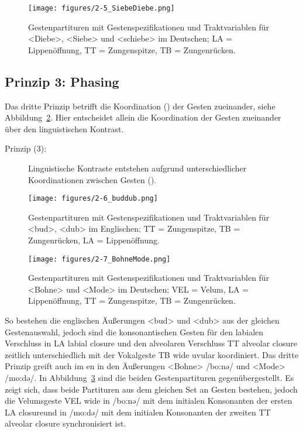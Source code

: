 \begin{figure}[t]
	\texttt{[image: figures/2-5\_SiebeDiebe.png]}
	\caption{Gestenpartituren mit Gestenspezifikationen und Traktvariablen für <Diebe>, <Siebe> und <schiebe> im Deutschen; LA = Lippenöffnung, TT = Zungenspitze, TB = Zungenrücken.}
	\label{figure:0205}
\end{figure}


\subsection{Prinzip 3: Phasing}
\label{subsec:020103}
Das dritte Prinzip betrifft die Koordination () der Gesten zueinander, siehe Abbildung~\ref{figure:0206}. Hier entscheidet allein die Koordination der Gesten zueinander über den linguistischen Kontrast. 

\begin{description}
	\item[Prinzip (3):] Linguistische Kontraste entstehen aufgrund unterschiedlicher Koordinationen zwischen Gesten ().
\end{description}

\begin{figure}
	\texttt{[image: figures/2-6\_buddub.png]}
	\caption{Gestenpartituren mit Gestenspezifikationen und Traktvariablen für <bud>, <dub> im Englischen; TT = Zungenspitze, TB = Zungenrücken, LA = Lippenöffnung.}
	\label{figure:0206}
\end{figure}

\begin{figure} 
	\texttt{[image: figures/2-7\_BohneMode.png]}
	\caption{Gestenpartituren mit Gestenspezifikationen und Traktvariablen für <Bohne> und <Mode> im Deutschen; VEL = Velum, LA = Lippenöffnung, TT = Zungenspitze, TB = Zungenrücken.}
	\label{figure:0207}
\end{figure}

So bestehen die englischen Äußerungen <bud> und <dub> aus der gleichen Gestenauswahl, jedoch sind die konsonantischen Gesten für den labialen Verschluss in {LA labial closure} und den alveolaren Verschluss {TT alveolar closure} zeitlich unterschiedlich mit der Vokalgeste {TB wide uvular} koordiniert. Das dritte Prinzip greift auch im en in den Äußerungen <Bohne> /bo:nə/ und <Mode> /mo:də/. In Abbildung~\ref{figure:0207} sind die beiden Gestenpartituren gegenübergestellt. Es zeigt sich, dass beide Partituren aus dem gleichen Set an Gesten bestehen, jedoch die Velumsgeste {VEL wide} in /bo:nə/ mit dem initialen Konsonanten der ersten  {LA closure}und in /mo:də/ mit dem initialen Konsonanten der zweiten  {TT alveolar closure} synchronisiert ist.



